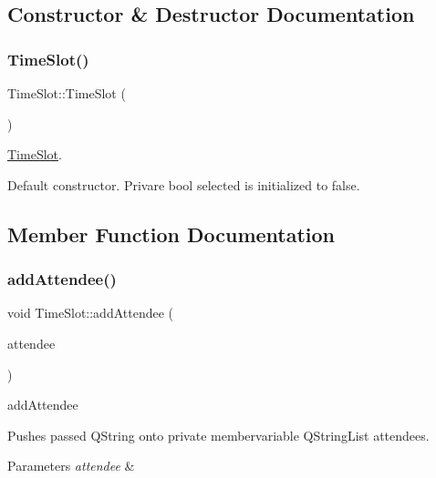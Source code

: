 \subsection{Constructor \& Destructor Documentation}
\mbox{\label{class_time_slot_a8bdfc0039c8da76edc16c4a1070bdc80}} 
\subsubsection{\texorpdfstring{Time\+Slot()}{TimeSlot()}}
{\footnotesize\ttfamily Time\+Slot\+::\+Time\+Slot (\begin{DoxyParamCaption}{ }\end{DoxyParamCaption})}



\hyperlink{class_time_slot}{Time\+Slot}. 

Default constructor. Privare bool selected is initialized to false. 

\subsection{Member Function Documentation}
\mbox{\label{class_time_slot_a7b0ee031f73b9f6eb40fee11939b9a7e}} 
\subsubsection{\texorpdfstring{add\+Attendee()}{addAttendee()}}
{\footnotesize\ttfamily void Time\+Slot\+::add\+Attendee (\begin{DoxyParamCaption}\item[{Q\+String}]{attendee }\end{DoxyParamCaption})}



add\+Attendee 

Pushes passed Q\+String onto private membervariable Q\+String\+List attendees. 
\begin{DoxyParams}{Parameters}
{\em attendee} & \\
\hline
\end{DoxyParams}
\mbox{\label{class_time_slot_ab955b538853b38792c502f30beea5d9b}} 
